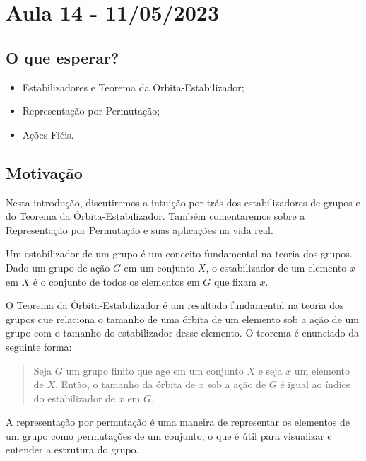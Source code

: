 \documentclass{article}
\begin{document}
\section{Aula 14 - 11/05/2023}
\subsection{O que esperar?}
\begin{itemize}
  \item Estabilizadores e Teorema da Orbita-Estabilizador;
  \item Representa\c cão por Permuta\c cão;
  \item A\c cões Fiéis.
\end{itemize}
\subsection{Motiva\c cão}
  Nesta introdu\c cão, discutiremos a intuição por trás dos estabilizadores de grupos e do Teorema da Órbita-Estabilizador. Também comentaremos sobre a
  Representação por Permutação e suas aplicações na vida real.

  Um estabilizador de um grupo é um conceito fundamental na teoria dos grupos. Dado um grupo de ação $G$ em um conjunto $X$, o estabilizador de um elemento
  $x$ em $X$ é o conjunto de todos os elementos em $G$ que fixam $x$.

  O Teorema da Órbita-Estabilizador é um resultado fundamental na teoria dos grupos que relaciona o tamanho de uma órbita de um elemento sob a ação de um grupo
  com o tamanho do estabilizador desse elemento. O teorema é enunciado da seguinte forma:
 \begin{quote}
   Seja $G$ um grupo finito que age em um conjunto $X$ e seja $x$ um elemento de $X$. Então, o tamanho da órbita de $x$ sob a ação de $G$ é igual ao
   índice do estabilizador de $x$ em $G$.
 \end{quote}

  A representação por permutação é uma maneira de representar os elementos de um grupo como permutações de um conjunto, o que é útil para visualizar e entender
  a estrutura do grupo.
\end{document}
